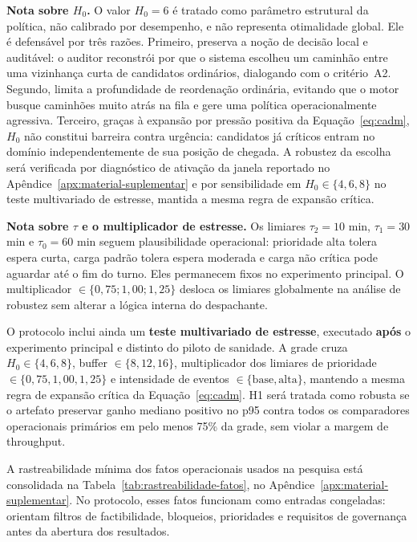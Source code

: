 \documentclass[
  12pt,
  oneside,
  a4paper,
  sumario=tradicional,
  brazil
]{abntex2}
\begin{document}
\noindent\textbf{Nota sobre $H_0$.}
O valor $H_0=6$ \'e tratado como par\^ametro estrutural da pol\'itica, n\~ao calibrado por desempenho, e n\~ao representa otimalidade global. Ele \'e defens\'avel por tr\^es raz\~oes. Primeiro, preserva a no\c{c}\~ao de decis\~ao local e audit\'avel: o auditor reconstr\'oi por que o sistema escolheu um caminh\~ao entre uma vizinhan\c{c}a curta de candidatos ordin\'arios, dialogando com o crit\'erio~A2. Segundo, limita a profundidade de reordena\c{c}\~ao ordin\'aria, evitando que o motor busque caminh\~oes muito atr\'as na fila e gere uma pol\'itica operacionalmente agressiva. Terceiro, gra\c{c}as \`a expans\~ao por press\~ao positiva da Equa\c{c}\~ao~\eqref{eq:cadm}, $H_0$ n\~ao constitui barreira contra urg\^encia: candidatos j\'a cr\'iticos entram no dom\'inio independentemente de sua posi\c{c}\~ao de chegada. A robustez da escolha ser\'a verificada por diagn\'ostico de ativa\c{c}\~ao da janela reportado no Ap\^endice~\ref{apx:material-suplementar} e por sensibilidade em $H_0 \in \{4,6,8\}$ no teste multivariado de estresse, mantida a mesma regra de expans\~ao cr\'itica.

\noindent\textbf{Nota sobre $\tau$ e o multiplicador de estresse.}
Os limiares $\tau_2=10$ min, $\tau_1=30$ min e $\tau_0=60$ min seguem plausibilidade operacional: prioridade alta tolera espera curta, carga padr\~ao tolera espera moderada e carga n\~ao cr\'itica pode aguardar at\'e o fim do turno. Eles permanecem fixos no experimento principal. O multiplicador $\in\{0{,}75;1{,}00;1{,}25\}$ desloca os limiares globalmente na an\'alise de robustez sem alterar a l\'ogica interna do despachante.

O protocolo inclui ainda um \textbf{teste multivariado de estresse}, executado \textbf{ap\'os} o experimento principal e distinto do piloto de sanidade. A grade cruza $H_0 \in \{4,6,8\}$, buffer $\in \{8,12,16\}$, multiplicador dos limiares de prioridade $\in \{0{,}75,1{,}00,1{,}25\}$ e intensidade de eventos $\in \{\text{base},\text{alta}\}$, mantendo a mesma regra de expans\~ao cr\'itica da Equa\c{c}\~ao~\eqref{eq:cadm}. H1 ser\'a tratada como robusta se o artefato preservar ganho mediano positivo no p95 contra todos os comparadores operacionais prim\'arios em pelo menos 75\% da grade, sem violar a margem de throughput.

A rastreabilidade m\'inima dos fatos operacionais usados na pesquisa est\'a consolidada na Tabela~\ref{tab:rastreabilidade-fatos}, no Ap\^endice~\ref{apx:material-suplementar}. No protocolo, esses fatos funcionam como entradas congeladas: orientam filtros de factibilidade, bloqueios, prioridades e requisitos de governan\c{c}a antes da abertura dos resultados.
\end{document}
